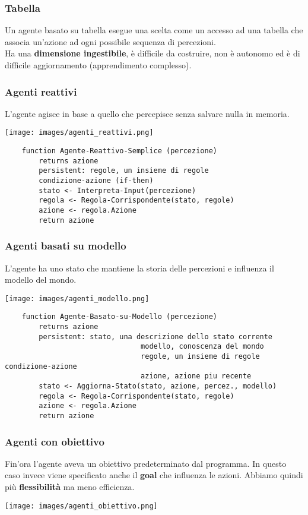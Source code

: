 \subsubsection{Tabella}
Un agente basato su tabella esegue una scelta come un accesso ad una tabella che associa un'azione ad ogni possibile sequenza di percezioni.\\
Ha una \textbf{dimensione ingestibile}, è difficile da costruire, non è autonomo ed è di difficile aggiornamento (apprendimento complesso).

\subsubsection{Agenti reattivi}
L'agente agisce in base a quello che percepisce senza salvare nulla in memoria.
\begin{center}
	\texttt{[image: images/agenti\_reattivi.png]}
\end{center}
\begin{lstlisting}
	function Agente-Reattivo-Semplice (percezione)
		returns azione
		persistent: regole, un insieme di regole
		condizione-azione (if-then)
		stato <- Interpreta-Input(percezione)
		regola <- Regola-Corrispondente(stato, regole)
		azione <- regola.Azione
		return azione
\end{lstlisting}

\subsubsection{Agenti basati su modello}
L'agente ha uno stato che mantiene la storia delle percezioni e influenza il modello del mondo.
\begin{center}
	\texttt{[image: images/agenti\_modello.png]}
\end{center}
\begin{lstlisting}
	function Agente-Basato-su-Modello (percezione)
		returns azione
		persistent: stato, una descrizione dello stato corrente
								modello, conoscenza del mondo
								regole, un insieme di regole condizione-azione
								azione, azione piu recente
		stato <- Aggiorna-Stato(stato, azione, percez., modello)
		regola <- Regola-Corrispondente(stato, regole)
		azione <- regola.Azione
		return azione
\end{lstlisting}

\subsubsection{Agenti con obiettivo}
Fin'ora l'agente aveva un obiettivo predeterminato dal programma. In questo caso invece viene specificato anche il \textbf{goal} che influenza le azioni. Abbiamo quindi più \textbf{flessibilità} ma meno efficienza.
\begin{center}
	\texttt{[image: images/agenti\_obiettivo.png]}
\end{center}

